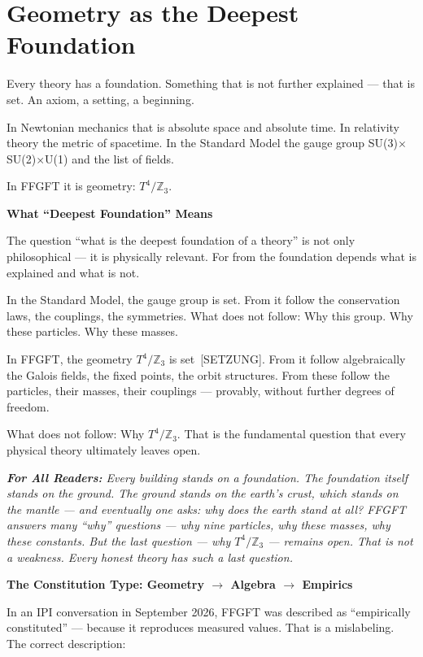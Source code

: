 \documentclass[11pt,oneside]{book}
\newcommand{\status}[1]{\penalty10000\,{\scriptsize\textcolor{gray!60}{[#1]}}}
\newenvironment{laierspur}{%
  \par\vspace{4pt}%
  \noindent\small\itshape\color{blue!60!black}%
  \textbf{For All Readers:}\enspace\ignorespaces}{%
  \par\vspace{4pt}\normalsize\normalfont\normalcolor}
\begin{document}
\chapter{Geometry as the Deepest Foundation}

Every theory has a foundation. Something that is not further explained —
that is set. An axiom, a setting, a beginning.

In Newtonian mechanics that is absolute space and absolute time. In
relativity theory the metric of spacetime. In the Standard Model the gauge
group SU(3)$\times$SU(2)$\times$U(1) and the list of fields.

In FFGFT it is geometry: $T^4/\mathbb{Z}_3$.

\textbf{What \enquote{Deepest Foundation} Means}

The question \enquote{what is the deepest foundation of a theory} is not only
philosophical — it is physically relevant. For from the foundation depends
what is explained and what is not.

In the Standard Model, the gauge group is set. From it follow the
conservation laws, the couplings, the symmetries. What does not follow: Why
this group. Why these particles. Why these masses.

In FFGFT, the geometry $T^4/\mathbb{Z}_3$ is set \status{SETZUNG}. From it follow
algebraically the Galois fields, the fixed points, the orbit structures.
From these follow the particles, their masses, their couplings — provably,
without further degrees of freedom.

What does not follow: Why $T^4/\mathbb{Z}_3$. That is the fundamental question
that every physical theory ultimately leaves open.

\begin{laierspur}
Every building stands on a foundation. The foundation itself stands on the
ground. The ground stands on the earth's crust, which stands on the mantle —
and eventually one asks: why does the earth stand at all? FFGFT answers many
\enquote{why} questions — why nine particles, why these masses, why these constants.
But the last question — why $T^4/\mathbb{Z}_3$ — remains open. That is not a
weakness. Every honest theory has such a last question.
\end{laierspur}

\textbf{The Constitution Type: Geometry $\to$ Algebra $\to$ Empirics}

In an IPI conversation in September 2026, FFGFT was described as \enquote{empirically
constituted} — because it reproduces measured values. That is a
mislabeling. The correct description:
\end{document}
